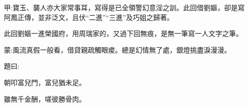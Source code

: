 

\begin{parag}
    \begin{note}甲:寶玉、襲人亦大家常事耳，寫得是已全領警幻意淫之訓。此回借劉嫗，卻是寫阿鳳正傳，並非泛文，且伏“二進”“三進”及巧姐之歸著。\end{note}
\end{parag}


\begin{parag}
    \begin{note}此回劉嫗一進榮國府，用周瑞家的，又過下回無痕，是無一筆寫一人文字之筆。\end{note}
\end{parag}


\begin{parag}
    \begin{note}蒙:風流真假一般看，借貸親疏觸眼痠。總是幻情無了處，銀燈挑盡淚漫漫。\end{note}
\end{parag}


\begin{parag}
    題曰:
\end{parag}


\begin{poem}
    \begin{pl}朝叩富兒門，富兒猶未足。\end{pl}

    \begin{pl}雖無千金酬，嗟彼勝骨肉。\end{pl}
\end{poem}


